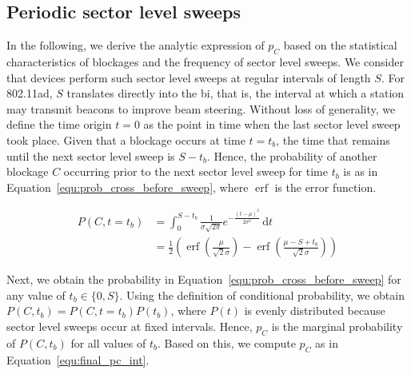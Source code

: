 \documentclass{article}
\DeclareMathOperator\erf{erf}
\begin{document}
\subsection{Periodic sector level sweeps}

In the following, we derive the analytic expression of $p_C$ based on the statistical characteristics of blockages and the frequency of sector level sweeps. We consider that devices perform such sector level sweeps at regular intervals of length $S$. For 802.11ad, $S$ translates directly into the \ac{bi}, that is, the interval at which a station may transmit beacons to improve beam steering. Without loss of generality, we define the time origin $t = 0$ as the point in time when the last sector level sweep took place. Given that a blockage occurs at time $t = t_b$, the time that remains until the next sector level sweep is $S - t_b$. Hence, the probability of another blockage $C$ occurring prior to the next sector level sweep for time $t_b$ is as in Equation~\ref{equ:prob_cross_before_sweep}, where $\erf$ is the error function.

\vspace{-4mm}
\begin{equation}	
	\begin{split}
		P(C, t = t_b)	& = \int_0^{S-t_b} \frac{1}{\sigma \sqrt{2\pi}} e^{-\frac{(t-\mu)^2}{2\sigma^2}} \, \mathrm{d}t \\[1.5mm]
					& = \frac{1}{2} \left( \erf{\left( \frac{\mu}{\sqrt{2}\sigma} \right)} - \erf{\left( \frac{\mu-S+t_b}{\sqrt{2}\sigma} \right)} \right)
	\end{split}	
\label{equ:prob_cross_before_sweep}
\end{equation}
\vspace{-2mm}

Next, we obtain the probability in Equation~\ref{equ:prob_cross_before_sweep} for any value of $t_b \in \{0, S\}$. Using the definition of conditional probability, we obtain $P(C, t_b) = P(C, t = t_b) P(t_b)$, where $P(t)$ is evenly distributed because sector level sweeps occur at fixed intervals. 
Hence, $p_C$ is the marginal probability of $P(C, t_b)$ for all values of $t_b$. Based on this, we compute $p_C$ as in Equation~\ref{equ:final_pc_int}.
\end{document}
